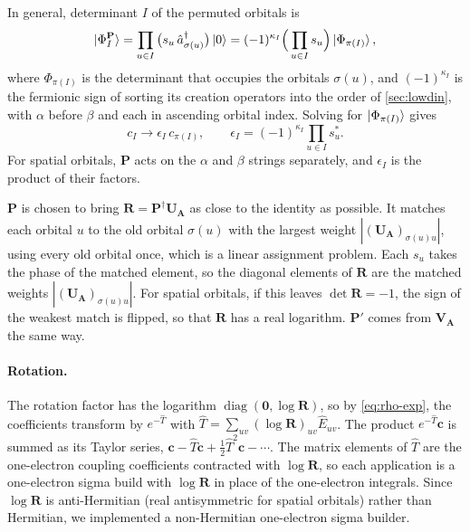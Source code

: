 \documentclass[aip,jcp,preprint]{revtex4-1}
\newcommand{\bvec}[1]{\mathbf{#1}}
\newcommand{\diag}{\operatorname{diag}}
\begin{document}
In general, determinant $I$ of the permuted orbitals is
\begin{equation}
 \ket{\Phi^{\bvec{P}}_I}
 = \prod_{u \in I} \big(s_u\,\hat{a}^\dagger_{\sigma(u)}\big)\ket{0}
 = (-1)^{\kappa_I}\Big(\prod_{u \in I} s_u\Big)\ket{\Phi_{\pi(I)}},
\end{equation}
where $\Phi_{\pi(I)}$ is the determinant that occupies the orbitals $\sigma(u)$, and $(-1)^{\kappa_I}$ is the fermionic sign of sorting its creation operators into the order of \cref{sec:lowdin}, with $\alpha$ before $\beta$ and each in ascending orbital index.
Solving for $\ket{\Phi_{\pi(I)}}$ gives
\begin{equation}
 c_I \to \epsilon_I\, c_{\pi(I)},
 \qquad
 \epsilon_I = (-1)^{\kappa_I}\prod_{u \in I} s_u^*.
\end{equation}
For spatial orbitals, $\bvec{P}$ acts on the $\alpha$ and $\beta$ strings separately, and $\epsilon_I$ is the product of their factors.

$\bvec{P}$ is chosen to bring $\bvec{R} = \bvec{P}^\dagger\bvec{U}_{\bvec{A}}$ as close to the identity as possible.
It matches each orbital $u$ to the old orbital $\sigma(u)$ with the largest weight $|(\bvec{U}_{\bvec{A}})_{\sigma(u)u}|$, using every old orbital once, which is a linear assignment problem.
Each $s_u$ takes the phase of the matched element, so the diagonal elements of $\bvec{R}$ are the matched weights $|(\bvec{U}_{\bvec{A}})_{\sigma(u)u}|$.
For spatial orbitals, if this leaves $\det\bvec{R} = -1$, the sign of the weakest match is flipped, so that $\bvec{R}$ has a real logarithm.
$\bvec{P}'$ comes from $\bvec{V}_{\bvec{A}}$ the same way.

\paragraph{Rotation.}
The rotation factor has the logarithm $\diag(\bvec{0}, \log\bvec{R})$, so by \cref{eq:rho-exp}, the coefficients transform by $e^{-\hat{T}}$ with $\hat{T} = \sum_{uv} (\log\bvec{R})_{uv}\hat{E}_{uv}$.
The product $e^{-\hat{T}}\bvec{c}$ is summed as its Taylor series, $\bvec{c} - \hat{T}\bvec{c} + \frac{1}{2}\hat{T}^2\bvec{c} - \cdots$.
The matrix elements of $\hat{T}$ are the one-electron coupling coefficients contracted with $\log\bvec{R}$, so each application is a one-electron sigma build with $\log\bvec{R}$ in place of the one-electron integrals.
Since $\log\bvec{R}$ is anti-Hermitian (real antisymmetric for spatial orbitals) rather than Hermitian, we implemented a non-Hermitian one-electron sigma builder.
\end{document}
